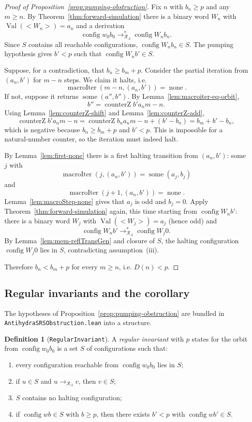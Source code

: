 \documentclass[11pt,a4paper]{article}
\theoremstyle{definition}
\newtheorem{definition}{Definition}[section]
\newcommand{\lt}{<}
\newcommand{\gt}{>}
\newcommand{\val}{\operatorname{Val}}
\newcommand{\config}{\operatorname{config}}
\newcommand{\antihydraSRS}{\mathcal{R}_{A}}
\newcommand{\some}{\operatorname{some}}
\newcommand{\none}{\operatorname{none}}
\newcommand{\counterZ}{\operatorname{counterZ}}
\newcommand{\macroIter}{\operatorname{macroIter}}
\begin{document}
\begin{proof}[Proof of Proposition~\ref{prop:pumping-obstruction}]
Fix $n$ with $b_n\ge p$ and any $m\ge n$.  By
Theorem~\ref{thm:forward-simulation} there is a binary word $W_n$ with
$\val(\lt W_n\gt)=a_n$ and a derivation
\[
  \config{w_0}{b_0}\to^{*}_{\antihydraSRS}\config{W_n}{b_n}.
\]
Since $S$ contains all reachable configurations,
$\config{W_n}{b_n}\in S$.  The pumping hypothesis gives $b'<p$ such that
$\config{W_n}{b'}\in S$.

Suppose, for a contradiction, that $b_n\ge b_m+p$.  Consider the partial
iteration from $(a_n,b')$ for $m-n$ steps.  We claim it halts, i.e.
\[
  \macroIter(m-n,(a_n,b'))=\none.
\]
If not, suppose it returns $\some(a'',b'')$.  By
Lemma~\ref{lem:macroiter-eq-orbit},
\[
  b''=\counterZ{b'}{a_n}{m-n}.
\]
Using Lemma~\ref{lem:counterZ-shift} and Lemma~\ref{lem:counterZ-add},
\[
  \counterZ{b'}{a_n}{m-n}
  =\counterZ{b_n}{a_n}{m-n}+(b'-b_n)
  =b_m+b'-b_n,
\]
which is negative because $b_n\ge b_m+p$ and $b'<p$.  This is impossible
for a natural-number counter, so the iteration must indeed halt.

By Lemma~\ref{lem:first-none} there is a first halting transition from
$(a_n,b')$: some $j$ with
\[
  \macroIter(j,(a_n,b'))=\some(a_j,b_j)
\]
and
\[
  \macroIter(j+1,(a_n,b'))=\none.
\]
Lemma~\ref{lem:macroStep-none} gives that $a_j$ is odd and $b_j=0$.
Apply
Theorem~\ref{thm:forward-simulation} again, this time starting from
$\config{W_n}{b'}$: there is a binary word $W_j$ with
$\val(\lt W_j\gt)=a_j$ (hence odd) and
\[
  \config{W_n}{b'}\to^{*}_{\antihydraSRS}\config{W_j}{0}.
\]
By Lemma~\ref{lem:mem-reflTransGen} and closure of $S$, the halting
configuration $\config{W_j}{0}$ lies in $S$, contradicting assumption~(iii).

Therefore $b_n<b_m+p$ for every $m\ge n$, i.e. $D(n)<p$.
\end{proof}

\subsection{Regular invariants and the corollary}

The hypotheses of Proposition~\ref{prop:pumping-obstruction} are bundled
in \texttt{AntihydraSRSObstruction.lean} into a structure.

\begin{definition}[\texttt{RegularInvariant}]
\label{def:regular-invariant}
A \emph{regular invariant} with $p$ states for the orbit from
$\config{w_0}{b_0}$ is a set $S$ of configurations such that:
\begin{enumerate}
\item[\textup{(reach)}] every configuration reachable from
  $\config{w_0}{b_0}$ lies in $S$;
\item[\textup{(closed)}] if $u\in S$ and $u\to_{\antihydraSRS}v$, then
  $v\in S$;
\item[\textup{(noHalt)}] $S$ contains no halting configuration;
\item[\textup{(pump)}] if $\config{w}{b}\in S$ with $b\ge p$, then there
  exists $b'<p$ with $\config{w}{b'}\in S$.
\end{enumerate}
\end{definition}
\end{document}
